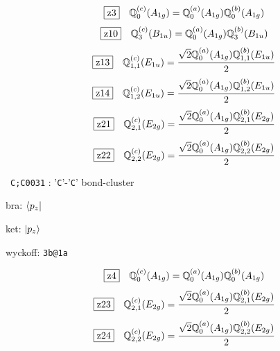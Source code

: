 \documentclass[fleqn,10pt,landscape]{jsarticle}
\begin{document}
\begin{dmath*}
\hspace*{3mm}\fbox{z3}\quad \mathbb{Q}_{0}^{(c)}(A_{1g})=\mathbb{Q}_{0}^{(a)}(A_{1g}) \mathbb{Q}_{0}^{(b)}(A_{1g})
\end{dmath*}
\begin{dmath*}
\hspace*{3mm}\fbox{z10}\quad \mathbb{Q}_{3}^{(c)}(B_{1u})=\mathbb{Q}_{0}^{(a)}(A_{1g}) \mathbb{Q}_{3}^{(b)}(B_{1u})
\end{dmath*}
\begin{dmath*}
\hspace*{3mm}\fbox{z13}\quad \mathbb{Q}_{1,1}^{(c)}(E_{1u})=\frac{\sqrt{2} \mathbb{Q}_{0}^{(a)}(A_{1g}) \mathbb{Q}_{1,1}^{(b)}(E_{1u})}{2}
\end{dmath*}
\begin{dmath*}
\hspace*{3mm}\fbox{z14}\quad \mathbb{Q}_{1,2}^{(c)}(E_{1u})=\frac{\sqrt{2} \mathbb{Q}_{0}^{(a)}(A_{1g}) \mathbb{Q}_{1,2}^{(b)}(E_{1u})}{2}
\end{dmath*}
\begin{dmath*}
\hspace*{3mm}\fbox{z21}\quad \mathbb{Q}_{2,1}^{(c)}(E_{2g})=\frac{\sqrt{2} \mathbb{Q}_{0}^{(a)}(A_{1g}) \mathbb{Q}_{2,1}^{(b)}(E_{2g})}{2}
\end{dmath*}
\begin{dmath*}
\hspace*{3mm}\fbox{z22}\quad \mathbb{Q}_{2,2}^{(c)}(E_{2g})=\frac{\sqrt{2} \mathbb{Q}_{0}^{(a)}(A_{1g}) \mathbb{Q}_{2,2}^{(b)}(E_{2g})}{2}
\end{dmath*}
\vspace{5mm}

\noindent\textbullet\, \texttt{C;C\texttt{}003\texttt{}1} : '\texttt{C}'-'\texttt{C}' bond-cluster

\noindent\quad * bra: $\bra{p_{z}}$

\noindent\quad * ket: $\ket{p_{z}}$

\noindent\quad * wyckoff: \texttt{3b@1a}

\begin{dmath*}
\hspace*{3mm}\fbox{z4}\quad \mathbb{Q}_{0}^{(c)}(A_{1g})=\mathbb{Q}_{0}^{(a)}(A_{1g}) \mathbb{Q}_{0}^{(b)}(A_{1g})
\end{dmath*}
\begin{dmath*}
\hspace*{3mm}\fbox{z23}\quad \mathbb{Q}_{2,1}^{(c)}(E_{2g})=\frac{\sqrt{2} \mathbb{Q}_{0}^{(a)}(A_{1g}) \mathbb{Q}_{2,1}^{(b)}(E_{2g})}{2}
\end{dmath*}
\begin{dmath*}
\hspace*{3mm}\fbox{z24}\quad \mathbb{Q}_{2,2}^{(c)}(E_{2g})=\frac{\sqrt{2} \mathbb{Q}_{0}^{(a)}(A_{1g}) \mathbb{Q}_{2,2}^{(b)}(E_{2g})}{2}
\end{dmath*}
\vspace{5mm}
\end{document}
